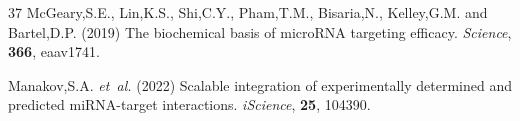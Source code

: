 \documentclass[unnumsec,webpdf,contemporary,large]{oup-authoring-template}
\begin{document}
\begin{thebibliography}{37}
McGeary,S.E., Lin,K.S., Shi,C.Y., Pham,T.M., Bisaria,N., Kelley,G.M. and Bartel,D.P. (2019) The biochemical basis of microRNA targeting efficacy. \textit{Science}, \textbf{366}, eaav1741.

Manakov,S.A. \textit{et~al.} (2022) Scalable integration of experimentally determined and predicted miRNA-target interactions. \textit{iScience}, \textbf{25}, 104390.

\end{thebibliography}
\end{document}
